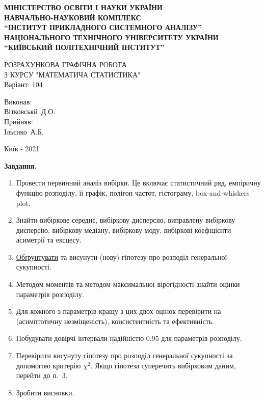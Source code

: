 \documentclass[14pt,a4paper]{scrartcl}
\begin{document}
  \begin{titlepage}
    \begin{center}
      \textbf{МІНІСТЕРСТВО ОСВІТИ І НАУКИ УКРАЇНИ\\
      НАВЧАЛЬНО-НАУКОВИЙ КОМПЛЕКС\\
      ``ІНСТИТУТ ПРИКЛАДНОГО СИСТЕМНОГО АНАЛІЗУ''\\
      НАЦІОНАЛЬНОГО ТЕХНІЧНОГО УНІВЕРСИТЕТУ УКРАЇНИ\\
      ``КИЇВСЬКИЙ ПОЛІТЕХНІЧНИЙ ІНСТИТУТ''}


      \vspace{1.5cm}
      РОЗРАХУНКОВА ГРАФІЧНА РОБОТА\\
      З КУРСУ "МАТЕМАТИЧА СТАТИСТИКА"\\
      Варіант: 104

      \vspace{5cm}

      \begin{flushright}
        Виконав:\\
        Вітковськй~Д.О.\\
        \vspace{3mm}
        Прийняв:\\
        Ільєнко~А.Б.
      \end{flushright}

      \vfill

      Київ - 2021
    \end{center}
  \end{titlepage}

\def\be{\begin{equation}} %
\def\ee{\end{equation}}
\def\D{\mathbb{D}}
\def\E{\mathbb{E}}

\renewcommand{\contentsname}{Зміст}
\tableofcontents

\newpage
\textbf{Завдання.}\\
\begin{enumerate}
  \item Провести первинний аналіз вибірки. Це включає статистичний ряд, емпіричну функцію розподілу, її графік, полігон частот, гістограму, box-and-whiskers plot.
  \item Знайти вибіркове середнє, вибіркову дисперсію, виправлену вибіркову дисперсію, вибіркову медіану, вибіркову моду, вибіркові коефіцієнти асиметрії та ексцесу.
  \item \underline{Обґрунтувати} та висунути (нову) гіпотезу про розподіл генеральної сукупності.
  \item Методом моментів та методом максимальної вірогідності знайти оцінки параметрів розподілу.
  \item Для кожного з параметрів кращу з цих двох оцінок перевірити на (асимптотичну незміщеність), консистентність та ефективність.
  \item Побудувати довірчі інтервали надійністю 0.95 для параметрів розподілу.
  \item Перевірити висунуту гіпотезу про розподіл генеральної сукупності за допомогою критерію $\chi^2$. Якщо гіпотеза суперечить вибірковим даним, перейти до п.~3.
  \item Зробити висновки.
\end{enumerate}
\newpage
\end{document}
